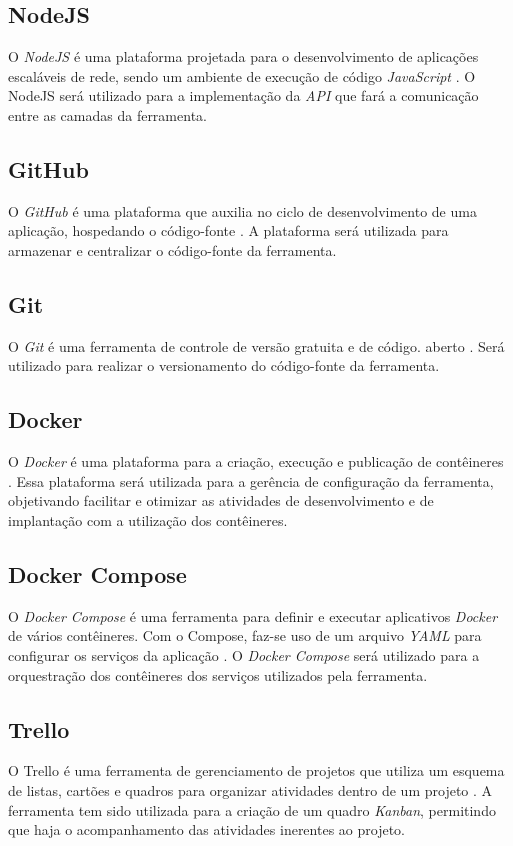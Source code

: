 \subsection{NodeJS}
O \textit{NodeJS} é uma plataforma projetada para o desenvolvimento de aplicações escaláveis de rede, sendo um ambiente de execução de código \textit{JavaScript} \cite{nodejs}. O NodeJS será utilizado para a implementação da \textit{API} que fará a comunicação entre as camadas da ferramenta.

\subsection{GitHub}
O \textit{GitHub} é uma plataforma que auxilia no ciclo de desenvolvimento de uma aplicação, hospedando o código-fonte \cite{github}. A plataforma será utilizada para armazenar e centralizar o código-fonte da ferramenta.

\subsection{Git}
O \textit{Git} é uma ferramenta de controle de versão gratuita e de código. aberto \cite{git}. Será utilizado para realizar o versionamento do código-fonte da ferramenta.

\subsection{Docker}
O \textit{Docker} é uma plataforma para a criação, execução e publicação de contêineres \cite{docker}. Essa plataforma será utilizada para a gerência de configuração da ferramenta, objetivando facilitar e otimizar as atividades de desenvolvimento e de implantação com a utilização dos contêineres.

\subsection{Docker Compose}
O \textit{Docker Compose} é uma ferramenta para definir e executar aplicativos \textit{Docker} de vários contêineres. Com o Compose, faz-se uso de um arquivo \textit{YAML} para configurar os serviços da aplicação \cite{docker-compose}. O \textit{Docker Compose} será utilizado para a orquestração dos contêineres dos serviços utilizados pela ferramenta.

\subsection{Trello}
O Trello é uma ferramenta de gerenciamento de projetos que utiliza um esquema de listas, cartões e quadros para organizar atividades dentro de um projeto \cite{trello}. A ferramenta tem sido utilizada para a criação de um quadro \textit{Kanban}, permitindo que haja o acompanhamento das atividades inerentes ao projeto.

